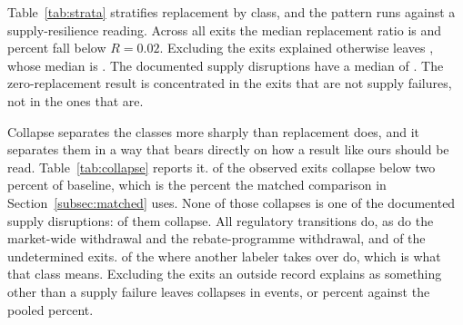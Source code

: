 \documentclass[pdflatex,sn-vancouver-num,Numbered]{sn-jnl}
\begin{document}
\begin{table}[htbp]
\caption{Every near-sole-labeler exit the corrected panel observes, with what the public record
establishes about its cause and its replacement ratio. Classes are ordered by how well the cause
is established, not by whether it is a supply failure. Markets are named by ingredient and
route-and-form bucket. Firm names are the current FDA labeler name for the NDC labeler code, not
necessarily the corporate entity that held the code at the time of the exit: a code can outlive
a merger, so a 2018 exit may display a name created later. The classification is keyed on the
code, the market and the quarter, never on the displayed name.}\label{tab:cause}

\end{table}

Table~\ref{tab:strata} stratifies replacement by class, and the pattern runs against a
supply-resilience reading. Across all \nCauseTotal exits the median replacement ratio is
\nSoleMedian and \nAllSoleLtTwo percent fall below $R=0.02$. Excluding the \nCauseExplainedW
exits explained otherwise leaves \nCauseNotExplained, whose median is \nCauseNotExplainedMed. The
\nCauseSupplyW documented supply disruptions have a median of \nSupplyMedian. The
zero-replacement result is concentrated in the exits that are not supply failures, not in the
ones that are.

Collapse separates the classes more sharply than replacement does, and it separates them in a
way that bears directly on how a result like ours should be read. Table~\ref{tab:collapse}
reports it. \nCollPooledColl of the \nCollPooledN observed exits collapse below two percent of
baseline, which is the \nCollPooledRate percent the matched comparison in
Section~\ref{subsec:matched} uses. None of those collapses is one of the \nCollSupplyN
documented supply disruptions: \nCollSupplyColl of them collapse. All \nCollTransitionAll
regulatory transitions do, as do the market-wide withdrawal and the rebate-programme
withdrawal, and \nCollUndet of the \nCauseUndeterminedW undetermined exits. \nCollContinued of
the \nCauseContinuedW where another labeler takes over do, which is what that class means.
Excluding the \nCauseExplainedW exits an outside record explains as something other than a
supply failure leaves \nCollRemCollW collapses in \nCollRemNW events, or \nCollRemRate percent
against the pooled \nCollPooledRate percent.
\end{document}
